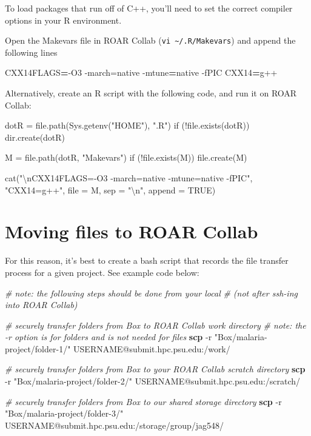 \documentclass[
]{book}
\newenvironment{Shaded}{\begin{snugshade}}{\end{snugshade}}
\newcommand{\AttributeTok}[1]{\textcolor[rgb]{0.13,0.29,0.53}{#1}}
\newcommand{\CommentTok}[1]{\textcolor[rgb]{0.56,0.35,0.01}{\textit{#1}}}
\newcommand{\ExtensionTok}[1]{#1}
\newcommand{\FunctionTok}[1]{\textcolor[rgb]{0.13,0.29,0.53}{\textbf{#1}}}
\newcommand{\NormalTok}[1]{#1}
\newcommand{\OperatorTok}[1]{\textcolor[rgb]{0.81,0.36,0.00}{\textbf{#1}}}
\newcommand{\StringTok}[1]{\textcolor[rgb]{0.31,0.60,0.02}{#1}}
\newcommand{\VariableTok}[1]{\textcolor[rgb]{0.00,0.00,0.00}{#1}}
\begin{document}
To load packages that run off of C++, you'll need to set the correct compiler options in your R environment.

Open the Makevars file in ROAR Collab (\texttt{vi\ \textasciitilde{}/.R/Makevars}) and append the following lines

\begin{Shaded}
\begin{Highlighting}[]
\VariableTok{CXX14FLAGS}\OperatorTok{=}\NormalTok{{-}O3 }\ExtensionTok{{-}march=native} \AttributeTok{{-}mtune}\OperatorTok{=}\NormalTok{native }\AttributeTok{{-}fPIC}
\VariableTok{CXX14}\OperatorTok{=}\NormalTok{g++}
\end{Highlighting}
\end{Shaded}

Alternatively, create an R script with the following code, and run it on ROAR Collab:

\begin{Shaded}
\begin{Highlighting}[]
\NormalTok{dotR = file.path(Sys.getenv("HOME"), ".R")}
\NormalTok{if (!file.exists(dotR)) dir.create(dotR)}

\NormalTok{M = file.path(dotR, "Makevars")}
\NormalTok{if (!file.exists(M)) file.create(M)}

\NormalTok{cat("\textbackslash{}nCXX14FLAGS={-}O3 {-}march=native {-}mtune=native {-}fPIC",}
\NormalTok{    "CXX14=g++",}
\NormalTok{    file = M, sep = "\textbackslash{}n", append = TRUE)}
\end{Highlighting}
\end{Shaded}

\section{Moving files to ROAR Collab}\label{moving-files-to-roar-collab}

For this reason, it's best to create a bash script that records the file transfer process for a given project. See example code below:

\begin{Shaded}
\begin{Highlighting}[]
\CommentTok{\# note: the following steps should be done from your local }
\CommentTok{\# (not after ssh{-}ing into ROAR Collab)}

\CommentTok{\# securely transfer folders from Box to ROAR Collab work directory}
\CommentTok{\# note: the {-}r option is for folders and is not needed for files}
\FunctionTok{scp} \AttributeTok{{-}r} \StringTok{"Box/malaria{-}project/folder{-}1/"}\NormalTok{ USERNAME@submit.hpc.psu.edu:/work/}

\CommentTok{\# securely transfer folders from Box to your ROAR Collab scratch directory}
\FunctionTok{scp} \AttributeTok{{-}r} \StringTok{"Box/malaria{-}project/folder{-}2/"}\NormalTok{ USERNAME@submit.hpc.psu.edu:/scratch/}

\CommentTok{\# securely transfer folders from Box to our shared storage directory}
\FunctionTok{scp} \AttributeTok{{-}r} \StringTok{"Box/malaria{-}project/folder{-}3/"}\NormalTok{ USERNAME@submit.hpc.psu.edu:/storage/group/jag548/}
\end{Highlighting}
\end{Shaded}
\end{document}
